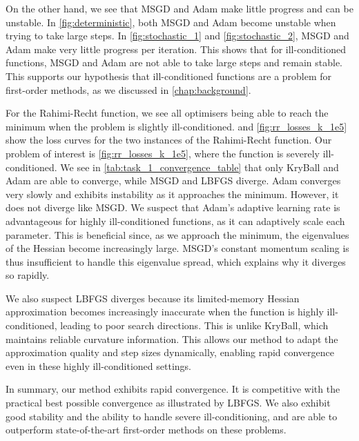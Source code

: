 On the other hand, we see that MSGD and Adam make little progress and can be unstable. In \cref{fig:deterministic}, both MSGD and Adam become unstable when trying to take large steps. In \cref{fig:stochastic_1} and \cref{fig:stochastic_2}, MSGD and Adam make very little progress per iteration. This shows that for ill-conditioned functions, MSGD and Adam are not able to take large steps and remain stable. This supports our hypothesis that ill-conditioned functions are a problem for first-order methods, as we discussed in \cref{chap:background}.

For the Rahimi-Recht function, we see all optimisers being able to reach the minimum when the problem is slightly ill-conditioned.  and \cref{fig:rr_losses_k_1e5} show the loss curves for the two instances of the Rahimi-Recht function. Our problem of interest is \cref{fig:rr_losses_k_1e5}, where the function is severely ill-conditioned. We see in \cref{tab:task_1_convergence_table} that only KryBall and Adam are able to converge, while MSGD and LBFGS diverge. Adam converges very slowly and exhibits instability as it approaches the minimum. However, it does not diverge like MSGD. We suspect that Adam's adaptive learning rate is advantageous for highly ill-conditioned functions, as it can adaptively scale each parameter. This is beneficial since, as we approach the minimum, the eigenvalues of the Hessian become increasingly large. MSGD's constant momentum scaling is thus insufficient to handle this eigenvalue spread, which explains why it diverges so rapidly.

We also suspect LBFGS diverges because its limited-memory Hessian approximation becomes increasingly inaccurate when the function is highly ill-conditioned, leading to poor search directions. This is unlike KryBall, which maintains reliable curvature information. This allows our method to adapt the approximation quality and step sizes dynamically, enabling rapid convergence even in these highly ill-conditioned settings.

In summary, our method exhibits rapid convergence. It is competitive with the practical best possible convergence as illustrated by LBFGS. We also exhibit good stability and the ability to handle severe ill-conditioning, and are able to outperform state-of-the-art first-order methods on these problems.

